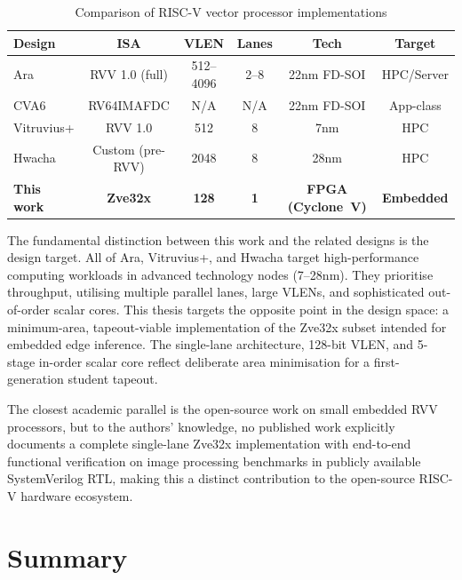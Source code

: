 \begin{table}[H]
  \centering
  \caption{Comparison of RISC-V vector processor implementations}
  \label{tab:related-work}
  \begin{tabular}{@{}lccccc@{}}
    \toprule
    \textbf{Design} & \textbf{ISA} & \textbf{VLEN} & \textbf{Lanes} & \textbf{Tech} & \textbf{Target} \\
    \midrule
    Ara \cite{ara2020}       & RVV 1.0 (full) & 512--4096 & 2--8 & 22nm FD-SOI & HPC/Server \\
    CVA6 \cite{cva6}         & RV64IMAFDC     & N/A        & N/A  & 22nm FD-SOI & App-class \\
    Vitruvius+ \cite{vitruvius2021} & RVV 1.0 & 512 & 8   & 7nm         & HPC \\
    Hwacha \cite{hwacha2015} & Custom (pre-RVV)& 2048      & 8    & 28nm        & HPC \\
    \textbf{This work}       & \textbf{Zve32x} & \textbf{128} & \textbf{1} & \textbf{FPGA (Cyclone~V)} & \textbf{Embedded} \\
    \bottomrule
  \end{tabular}
\end{table}

The fundamental distinction between this work and the related designs is the design
target. All of Ara, Vitruvius+, and Hwacha target high-performance computing workloads
in advanced technology nodes (7--28nm). They prioritise throughput, utilising multiple
parallel lanes, large VLENs, and sophisticated out-of-order scalar cores. This thesis
targets the opposite point in the design space: a minimum-area, tapeout-viable
implementation of the Zve32x subset intended for embedded edge inference. The single-lane
architecture, 128-bit VLEN, and 5-stage in-order scalar core reflect deliberate area
minimisation for a first-generation student tapeout.

The closest academic parallel is the open-source work on small embedded RVV processors,
but to the authors' knowledge, no published work explicitly documents a complete
single-lane Zve32x implementation with end-to-end functional verification on image
processing benchmarks in publicly available SystemVerilog RTL, making this a distinct
contribution to the open-source RISC-V hardware ecosystem.

\section{Summary}
\label{sec:background-summary}

